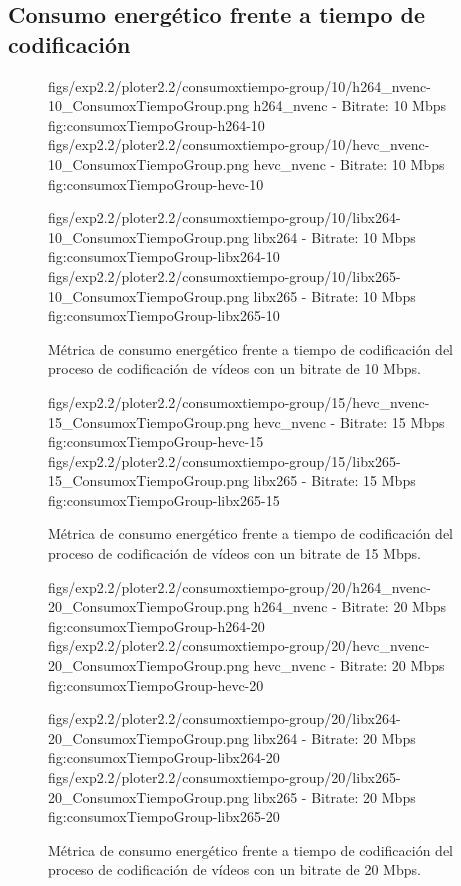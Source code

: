 \subsection*{Consumo energético frente a tiempo de codificación}

\begin{figure}[H]
 \centering
 \small
 \dosubfigs
 {figs/exp2.2/ploter2.2/consumoxtiempo-group/10/h264_nvenc-10_ConsumoxTiempoGroup.png}
 {h264\_nvenc - Bitrate: 10 Mbps}
 {fig:consumoxTiempoGroup-h264-10}
 {figs/exp2.2/ploter2.2/consumoxtiempo-group/10/hevc_nvenc-10_ConsumoxTiempoGroup.png}
 {hevc\_nvenc - Bitrate: 10 Mbps}
 {fig:consumoxTiempoGroup-hevc-10}

 \dosubfigs
 {figs/exp2.2/ploter2.2/consumoxtiempo-group/10/libx264-10_ConsumoxTiempoGroup.png}
 {libx264 - Bitrate: 10 Mbps}
 {fig:consumoxTiempoGroup-libx264-10}
 {figs/exp2.2/ploter2.2/consumoxtiempo-group/10/libx265-10_ConsumoxTiempoGroup.png}
 {libx265 - Bitrate: 10 Mbps}
 {fig:consumoxTiempoGroup-libx265-10}

 \caption{Métrica de consumo energético frente a tiempo de codificación del proceso de codificación de vídeos con un bitrate de 10 Mbps.}
\end{figure}


\begin{figure}[H]
 \centering
 \small
 \dosubfigs
 {figs/exp2.2/ploter2.2/consumoxtiempo-group/15/hevc_nvenc-15_ConsumoxTiempoGroup.png}
 {hevc\_nvenc - Bitrate: 15 Mbps}
 {fig:consumoxTiempoGroup-hevc-15}
 {figs/exp2.2/ploter2.2/consumoxtiempo-group/15/libx265-15_ConsumoxTiempoGroup.png}
 {libx265 - Bitrate: 15 Mbps}
 {fig:consumoxTiempoGroup-libx265-15}

 \caption{Métrica de consumo energético frente a tiempo de codificación del proceso de codificación de vídeos con un bitrate de 15 Mbps.}
\end{figure}


\begin{figure}[H]
 \centering
 \small
 \dosubfigs
 {figs/exp2.2/ploter2.2/consumoxtiempo-group/20/h264_nvenc-20_ConsumoxTiempoGroup.png}
 {h264\_nvenc - Bitrate: 20 Mbps}
 {fig:consumoxTiempoGroup-h264-20}
 {figs/exp2.2/ploter2.2/consumoxtiempo-group/20/hevc_nvenc-20_ConsumoxTiempoGroup.png}
 {hevc\_nvenc - Bitrate: 20 Mbps}
 {fig:consumoxTiempoGroup-hevc-20}

 \dosubfigs
 {figs/exp2.2/ploter2.2/consumoxtiempo-group/20/libx264-20_ConsumoxTiempoGroup.png}
 {libx264 - Bitrate: 20 Mbps}
 {fig:consumoxTiempoGroup-libx264-20}
 {figs/exp2.2/ploter2.2/consumoxtiempo-group/20/libx265-20_ConsumoxTiempoGroup.png}
 {libx265 - Bitrate: 20 Mbps}
 {fig:consumoxTiempoGroup-libx265-20}

 \caption{Métrica de consumo energético frente a tiempo de codificación del proceso de codificación de vídeos con un bitrate de 20 Mbps.}
\end{figure}


